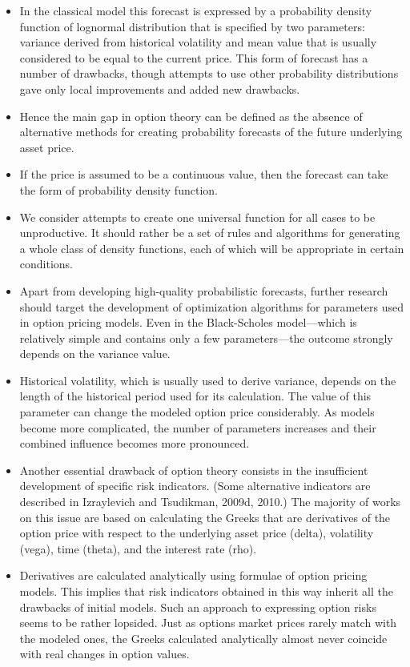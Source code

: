 \begin{itemize}
            \item In the classical model this forecast is expressed by a probability density function of lognormal distribution that is specified by two parameters: variance derived from historical volatility and mean value that is usually considered to be equal to the current price. This form of forecast has a number of drawbacks, though attempts to use other probability distributions gave only local improvements and added new drawbacks.
            \item Hence the main gap in option theory can be defined as the absence of alternative methods for creating probability forecasts of the future underlying asset price.
            \item If the price is assumed to be a continuous value, then the forecast can take the form of probability density function.
            \item We consider attempts to create one universal function for all cases to be unproductive. It should rather be a set of rules and algorithms for generating a whole class of density functions, each of which will be appropriate in certain conditions.
            \item Apart from developing high-quality probabilistic forecasts, further research should target the development of optimization algorithms for parameters used in option pricing models. Even in the Black-Scholes model—which is relatively simple and contains only a few parameters—the outcome strongly depends on the variance value.
            \item Historical volatility, which is usually used to derive variance, depends on the length of the historical period used for its calculation. The value of this parameter can change the modeled option price considerably. As models become more complicated, the number of parameters increases and their combined influence becomes more pronounced.
            \item Another essential drawback of option theory consists in the insufficient development of specific risk indicators. (Some alternative indicators are described in Izraylevich and Tsudikman, 2009d, 2010.) The majority of works on this issue are based on calculating the Greeks that are derivatives of the option price with respect to the underlying asset price (delta), volatility (vega), time (theta), and the interest rate (rho).
            \item Derivatives are calculated analytically using formulae of option pricing models. This implies that risk indicators obtained in this way inherit all the drawbacks of initial models. Such an approach to expressing option risks seems to be rather lopsided. Just as options market prices rarely match with the modeled ones, the Greeks calculated analytically almost never coincide with real changes in option values.

\end{itemize}
